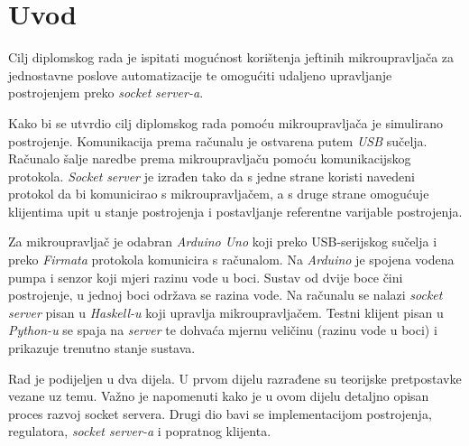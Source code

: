\setcounter{page}{1}

\chapter{Uvod} \label{introduction}

Cilj diplomskog rada je ispitati mogućnost korištenja jeftinih mikroupravljača
za jednostavne poslove automatizacije te omogućiti udaljeno upravljanje
postrojenjem preko \emph{socket} \emph{server-a}.

Kako bi se utvrdio cilj diplomskog rada pomoću mikroupravljača je simulirano
postrojenje. Komunikacija prema računalu je ostvarena putem \emph{USB}
sučelja. Računalo šalje naredbe prema mikroupravljaču pomoću komunikacijskog
protokola. \emph{Socket} \emph{server} je izrađen tako da s jedne strane koristi
navedeni protokol da bi komunicirao s mikroupravljačem, a s druge strane
omogućuje klijentima upit u stanje postrojenja i postavljanje referentne
varijable postrojenja.

Za mikroupravljač je odabran \emph{Arduino Uno} koji preko USB-serijskog sučelja
i preko \emph{Firmata} protokola komunicira s računalom. Na \emph{Arduino} je
spojena vodena pumpa i senzor koji mjeri razinu vode u boci. Sustav od dvije
boce čini postrojenje, u jednoj boci održava se razina vode. Na računalu se
nalazi \emph{socket} \emph{server} pisan u \emph{Haskell-u} koji upravlja
mikroupravljačem. Testni klijent pisan u \emph{Python-u} se spaja na
\emph{server} te dohvaća mjernu veličinu (razinu vode u boci) i prikazuje
trenutno stanje sustava.

Rad je podijeljen u dva dijela. U prvom dijelu razrađene su teorijske
pretpostavke vezane uz temu. Važno je napomenuti kako je u ovom dijelu detaljno
opisan proces razvoj socket servera. Drugi dio bavi se implementacijom
postrojenja, regulatora, \emph{socket server-a} i popratnog klijenta.
